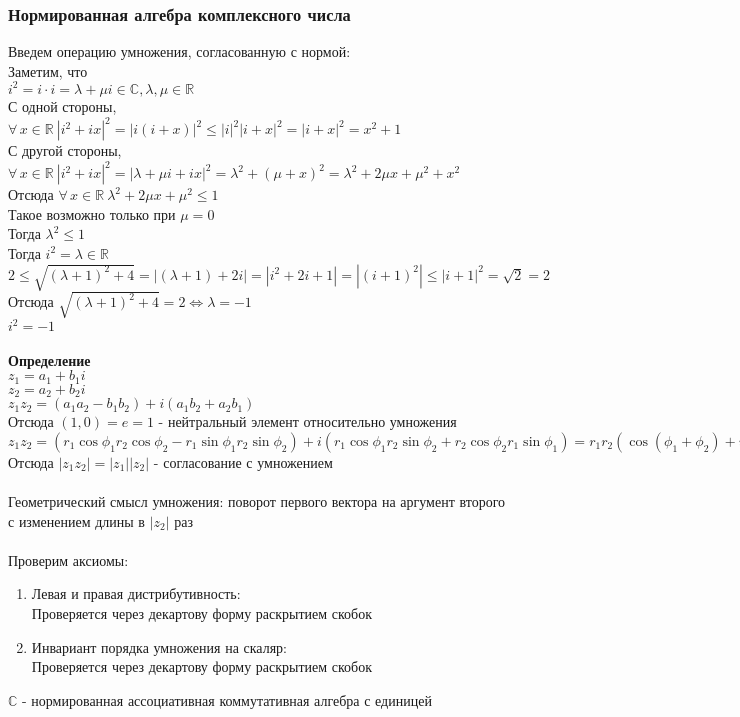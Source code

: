 \documentclass[12pt]{article}
\begin{document}
\subsubsection{Нормированная алгебра комплексного числа}
Введем операцию умножения, согласованную с нормой:\\
Заметим, что\\
$i^2=i\cdot i= \lambda +\mu i \in \mathbb{C}, \lambda,\mu \in \mathbb{R}$\\
С одной стороны,  $\forall\,x\in\mathbb{R}\ |i^2+ix|^2 = |i(i+x)|^2\leq|i|^2|i+x|^2=|i+x|^2=x^2+1$\\
С другой стороны, $\forall\,x\in\mathbb{R}\ |i^2+ix|^2 = |\lambda+\mu i+ix|^2 = \lambda^2+(\mu+x)^2=\lambda^2+2\mu x+\mu^2+x^2$\\
Отсюда $\forall\,x\in\mathbb{R}\ \lambda^2+2\mu x + \mu^2 \leq 1$\\Такое возможно только при $\mu = 0$\\
Тогда $\lambda^2 \leq 1$\\
Тогда $i^2 = \lambda \in \mathbb{R}$\\
$2 \leq \sqrt{(\lambda+1)^2+4} = |(\lambda+1)+2i| = |i^2+2i+1| = |(i+1)^2| \leq |i+1|^2=\sqrt{2}=2$\\
Отсюда $\sqrt{(\lambda+1)^2+4} = 2 \Leftrightarrow \lambda = -1$\\
$i^2 = -1$\\\\
\textbf{Определение}\\
$z_1=a_1+b_1i$\\
$z_2=a_2+b_2i$\\
$z_1z_2=(a_1a_2-b_1b_2)+i(a_1b_2+a_2b_1)$\\
Отсюда $(1,0)=e=1$ - нейтральный элемент относительно умножения\\
$z_1z_2 = (r_1\cos\phi_1r_2\cos\phi_2-r_1\sin\phi_1r_2\sin\phi_2)+i(r_1\cos\phi_1r_2\sin\phi_2+r_2\cos\phi_2r_1\sin\phi_1) = r_1r_2(\cos(\phi_1+\phi_2)+i\sin(\phi_1+\phi_2)) = |z_1||z_2|(\cos(\phi_1+\phi_2)+i\sin(\phi_1+\phi_2))$\\
Отсюда $|z_1z_2| = |z_1||z_2|$ - согласование с умножением\\\\
Геометрический смысл умножения: поворот первого вектора на аргумент второго с изменением длины в $|z_2|$ раз\\\\
Проверим аксиомы:
\begin{enumerate}
    \item Левая и правая дистрибутивность:\\
    Проверяется через декартову форму раскрытием скобок
    \item Инвариант порядка умножения на скаляр:\\
    Проверяется через декартову форму раскрытием скобок
\end{enumerate}
$\mathbb{C}$ - нормированная ассоциативная коммутативная алгебра с единицей
\end{document}
